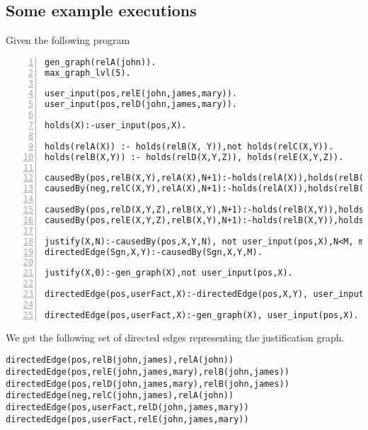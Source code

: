 \documentclass[sigconf]{acmart}
\begin{document}
\subsection{Some example executions}
Given the following program
\begin{lstlisting}[numbers=left]
gen_graph(relA(john)).
max_graph_lvl(5).

user_input(pos,relE(john,james,mary)).
user_input(pos,relD(john,james,mary)). 

holds(X):-user_input(pos,X).

holds(relA(X)) :- holds(relB(X, Y)),not holds(relC(X,Y)).
holds(relB(X,Y)) :- holds(relD(X,Y,Z)), holds(relE(X,Y,Z)).

causedBy(pos,relB(X,Y),relA(X),N+1):-holds(relA(X)),holds(relB(X, Y)),not holds(relC(X,Y)),justify(relA(X),N).
causedBy(neg,relC(X,Y),relA(X),N+1):-holds(relA(X)),holds(relB(X, Y)),not holds(relC(X,Y)),justify(relA(X),N).

causedBy(pos,relD(X,Y,Z),relB(X,Y),N+1):-holds(relB(X,Y)),holds(relD(X,Y,Z)),holds(relE(X,Y,Z)),justify(relB(X,Y),N).
causedBy(pos,relE(X,Y,Z),relB(X,Y),N+1):-holds(relB(X,Y)),holds(relD(X,Y,Z)),holds(relE(X,Y,Z)),justify(relB(X,Y),N).

justify(X,N):-causedBy(pos,X,Y,N), not user_input(pos,X),N<M, max_graph_lvl(M).
directedEdge(Sgn,X,Y):-causedBy(Sgn,X,Y,M).

justify(X,0):-gen_graph(X),not user_input(pos,X).

directedEdge(pos,userFact,X):-directedEdge(pos,X,Y), user_input(pos,X).

directedEdge(pos,userFact,X):-gen_graph(X), user_input(pos,X).
\end{lstlisting}
We get the following set of directed edges representing the justification graph. 
\begin{verbatim}
directedEdge(pos,relB(john,james),relA(john))
directedEdge(pos,relE(john,james,mary),relB(john,james))
directedEdge(pos,relD(john,james,mary),relB(john,james))
directedEdge(neg,relC(john,james),relA(john))
directedEdge(pos,userFact,relD(john,james,mary))
directedEdge(pos,userFact,relE(john,james,mary))
\end{verbatim}
\end{document}
